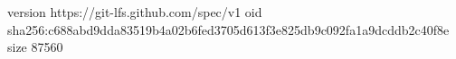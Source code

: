 version https://git-lfs.github.com/spec/v1
oid sha256:c688abd9dda83519b4a02b6fed3705d613f3e825db9c092fa1a9dcddb2c40f8e
size 87560
